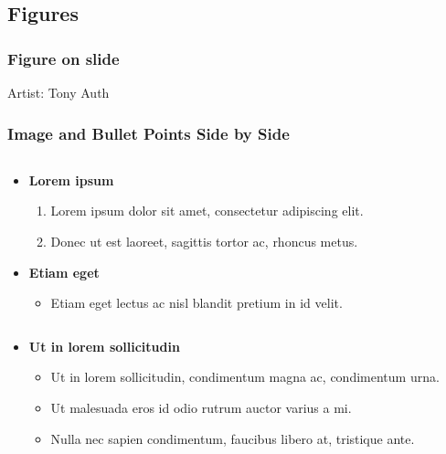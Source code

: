\documentclass[english,hangout]{beamer}
\begin{document}
\subsection{Figures}

\begin{frame}
\frametitle{Figure on slide}
\begin{center}
\end{center}
\vspace{-6mm}
\tiny Artist: Tony Auth
\end{frame}



\begin{frame}
\frametitle{Image and Bullet Points Side by Side}
\begin{columns}[onlytextwidth]
\begin{column}{.7\textwidth}
\begin{itemize}
\item \textbf{Lorem ipsum} 
\begin{enumerate}
\item Lorem ipsum dolor sit amet, consectetur adipiscing elit.
\item Donec ut est laoreet, sagittis tortor ac, rhoncus metus.
\end{enumerate}
\item \textbf{Etiam eget} 
\begin{itemize}
\item Etiam eget lectus ac nisl blandit pretium in id velit.
\end{itemize}
\end{itemize}
\end{column}

\begin{column}{.3\textwidth}
\end{column}
\end{columns}

\vspace{-.7mm}
\begin{itemize}
\item \textbf{Ut in lorem sollicitudin}
\begin{itemize}
\item Ut in lorem sollicitudin, condimentum magna ac, condimentum urna.
\item Ut malesuada eros id odio rutrum auctor varius a mi.
\item Nulla nec sapien condimentum, faucibus libero at, tristique ante.
\end{itemize}
\end{itemize}
\end{frame}
\end{document}

